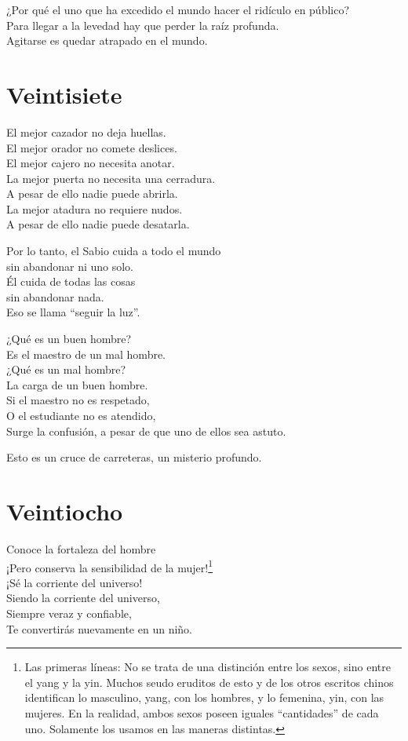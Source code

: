 \documentclass[book,b5paper,hidelinks,final]{memoir}
\begin{document}
	¿Por qué el uno que ha excedido el mundo hacer el ridículo en público?\\
	Para llegar a la levedad hay que perder la raíz profunda.\\
	Agitarse es quedar atrapado en el mundo.
	
	\chapter*{Veintisiete}
	
	El mejor cazador no deja huellas.\\
	El mejor orador no comete deslices.\\
	El mejor cajero no necesita anotar.\\
	La mejor puerta no necesita una cerradura.\\
	A pesar de ello nadie puede abrirla.\\
	La mejor atadura no requiere nudos.\\
	A pesar de ello nadie puede desatarla.
	
	Por lo tanto, el Sabio cuida a todo el mundo\\
	sin abandonar ni uno solo.\\
	Él cuida de todas las cosas\\
	sin abandonar nada.\\
	Eso se llama ``seguir la luz''.
	
	¿Qué es un buen hombre?\\
	Es el maestro de un mal hombre.\\
	¿Qué es un mal hombre?\\
	La carga de un buen hombre.\\
	Si el maestro no es respetado,\\
	O el estudiante no es atendido,\\
	Surge la confusión, a pesar de que uno de ellos sea astuto.
	
	Esto es un cruce de carreteras, un misterio profundo.
	
	\chapter*{Veintiocho}
	
	Conoce la fortaleza del hombre\\
	¡Pero conserva la sensibilidad de la mujer!\footnote{Las primeras líneas: No se trata de una distinción entre los sexos, sino
		entre el yang y la yin. Muchos seudo eruditos de esto y de los otros
		escritos chinos identifican lo masculino, yang, con los hombres, y lo
		femenina, yin, con las mujeres. En la realidad, ambos sexos poseen
		iguales ``cantidades'' de cada uno. Solamente los usamos en las maneras
		distintas.}\\
	¡Sé la corriente del universo!\\
	Siendo la corriente del universo,\\
	Siempre veraz y confiable,\\
	Te convertirás nuevamente en un niño.
	
\end{document}
